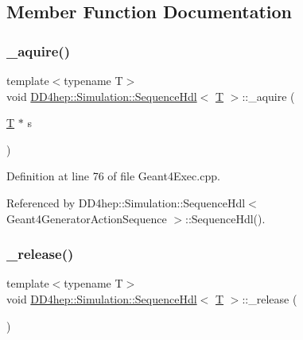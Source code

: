 \subsection{Member Function Documentation}
\hypertarget{class_d_d4hep_1_1_simulation_1_1_sequence_hdl_afe240bb5982f0cdaedc001a3cc1a50da}{}\label{class_d_d4hep_1_1_simulation_1_1_sequence_hdl_afe240bb5982f0cdaedc001a3cc1a50da} 
\subsubsection{\texorpdfstring{\+\_\+aquire()}{\_aquire()}}
{\footnotesize\ttfamily template$<$typename T$>$ \\
void \hyperlink{class_d_d4hep_1_1_simulation_1_1_sequence_hdl}{D\+D4hep\+::\+Simulation\+::\+Sequence\+Hdl}$<$ \hyperlink{class_t}{T} $>$\+::\+\_\+aquire (\begin{DoxyParamCaption}\item[{\hyperlink{class_t}{T} $\ast$}]{s }\end{DoxyParamCaption})\hspace{0.3cm}{\ttfamily [inline]}}



Definition at line 76 of file Geant4\+Exec.\+cpp.



Referenced by D\+D4hep\+::\+Simulation\+::\+Sequence\+Hdl$<$ Geant4\+Generator\+Action\+Sequence $>$\+::\+Sequence\+Hdl().

\hypertarget{class_d_d4hep_1_1_simulation_1_1_sequence_hdl_ad76a439f79bc1844bbcb33e3395c8454}{}\label{class_d_d4hep_1_1_simulation_1_1_sequence_hdl_ad76a439f79bc1844bbcb33e3395c8454} 
\subsubsection{\texorpdfstring{\+\_\+release()}{\_release()}}
{\footnotesize\ttfamily template$<$typename T$>$ \\
void \hyperlink{class_d_d4hep_1_1_simulation_1_1_sequence_hdl}{D\+D4hep\+::\+Simulation\+::\+Sequence\+Hdl}$<$ \hyperlink{class_t}{T} $>$\+::\+\_\+release (\begin{DoxyParamCaption}{ }\end{DoxyParamCaption})\hspace{0.3cm}{\ttfamily [inline]}}




